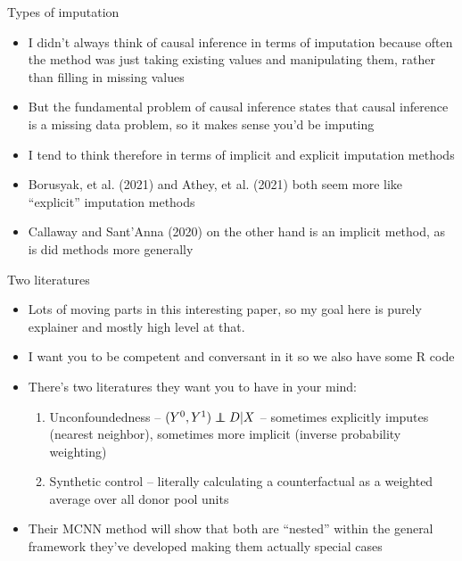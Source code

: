 \documentclass{beamer}
\newcommand\independent{\protect\mathpalette{\protect\independenT}{\perp}}
\def\independenT#1#2{\mathrel{\rlap{$#1#2$}\mkern2mu{#1#2}}}
\begin{document}
\begin{frame}{Types of imputation}

\begin{itemize}
\item I didn't always think of causal inference in terms of imputation because often the method was just taking existing values and manipulating them, rather than filling in missing values
\item But the fundamental problem of causal inference states that causal inference is a missing data problem, so it makes sense you'd be imputing
\item I tend to think therefore in terms of implicit and explicit imputation methods
\item Borusyak, et al. (2021) and Athey, et al. (2021) both seem more like ``explicit'' imputation methods
\item Callaway and Sant'Anna (2020) on the other hand is an implicit method, as is did methods more generally
\end{itemize}

\end{frame}

\begin{frame}{Two literatures}

\begin{itemize}
\item Lots of moving parts in this interesting paper, so my goal here is purely explainer and mostly high level at that. 
\item I want you to be competent and conversant in it so we also have some R code
\item There's two literatures they want you to have in your mind:
	\begin{enumerate}
	\item Unconfoundedness -- $(Y^0,Y^1)\independent D|X$ -- sometimes explicitly imputes (nearest neighbor), sometimes more implicit (inverse probability weighting)
	\item Synthetic control -- literally calculating a counterfactual as a weighted average over all donor pool units
	\end{enumerate}
\item Their MCNN method will show that both are ``nested'' within the general framework they've developed making them actually special cases
\end{itemize}

\end{frame}
\end{document}
